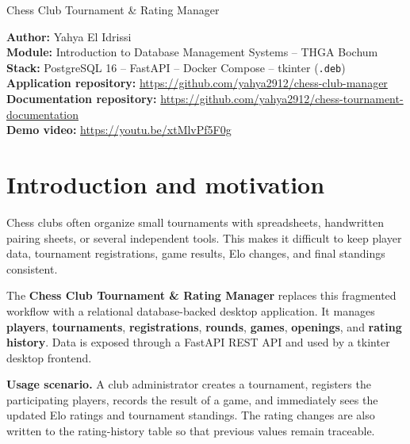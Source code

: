 \documentclass[11pt,a4paper]{article}
\begin{document}
\thispagestyle{empty}
%
{Chess Club Tournament \& Rating Manager}

\begin{infobox}
\textbf{Author:} Yahya El Idrissi \\
\textbf{Module:} Introduction to Database Management Systems -- THGA Bochum \\
\textbf{Stack:} PostgreSQL 16 -- FastAPI -- Docker Compose -- tkinter (\texttt{.deb}) \\
\textbf{Application repository:} \url{https://github.com/yahya2912/chess-club-manager} \\
\textbf{Documentation repository:} \url{https://github.com/yahya2912/chess-tournament-documentation} \\
\textbf{Demo video:} \url{https://youtu.be/xtMlvPf5F0g}
\end{infobox}

\tableofcontents

\vspace{1em}

\section{Introduction and motivation}

Chess clubs often organize small tournaments with spreadsheets, handwritten
pairing sheets, or several independent tools. This makes it difficult to keep
player data, tournament registrations, game results, Elo changes, and final
standings consistent.

The \textbf{Chess Club Tournament \& Rating Manager} replaces this fragmented
workflow with a relational database-backed desktop application. It manages
\textbf{players}, \textbf{tournaments}, \textbf{registrations},
\textbf{rounds}, \textbf{games}, \textbf{openings}, and
\textbf{rating history}. Data is exposed through a FastAPI REST API and used by
a tkinter desktop frontend.

\begin{beispielbox}
\textbf{Usage scenario.}
A club administrator creates a tournament, registers the participating players,
records the result of a game, and immediately sees the updated Elo ratings and
tournament standings. The rating changes are also written to the rating-history
table so that previous values remain traceable.
\end{beispielbox}
\end{document}
